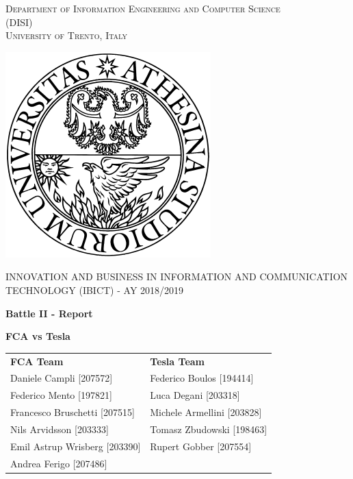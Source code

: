 \begin{titlepage}
	\begin{center}
   	{\scshape\LARGE
    	Department of Information Engineering and Computer Science\\ 
      	(DISI)\\ 
      	University of Trento, Italy\\\par}
      	\vspace{1cm}
      	\includegraphics[scale=0.5]{resources/logo}\\
	\vspace{1cm}
	{\scshape\Large INNOVATION AND BUSINESS IN INFORMATION AND COMMUNICATION TECHNOLOGY (IBICT) - AY 2018/2019\par}
	\vspace{1.5cm}
	{\huge\bfseries Battle II - Report\\\par}
	\vspace{1cm}
	{\Large\bfseries FCA vs Tesla\par}
      	\vfill
        \begin{tabular}{ll}
        \\
        \textbf{FCA Team}           &       \textbf{Tesla Team}         \\
       	Daniele Campli [207572]     &       Federico Boulos [194414]   \\
	    Federico Mento [197821]     &       Luca Degani [203318]       \\
	    Francesco Bruschetti [207515]       &       Michele Armellini [203828]        \\
	    Nils Arvidsson [203333]        &       Tomasz Zbudowski [198463]      \\
	    Emil Astrup Wrisberg [203390]        &          Rupert Gobber [207554]\\
	    Andrea Ferigo [207486]    \\
        \end{tabular}
      	\vfill
      	\vfill
	\end{center}
\end{titlepage}
